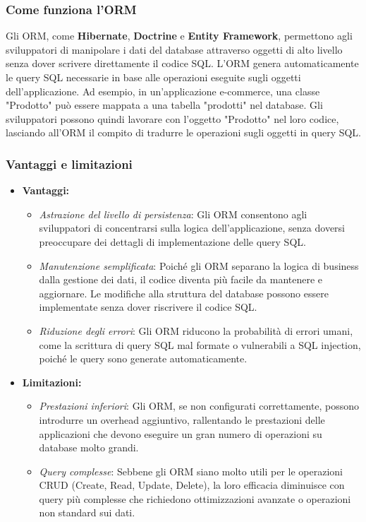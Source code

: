 \subsubsection{Come funziona l'ORM}
Gli ORM, come \textbf{Hibernate}, \textbf{Doctrine} e \textbf{Entity Framework}, permettono agli sviluppatori di manipolare i dati del database attraverso oggetti di alto livello senza dover scrivere direttamente il codice SQL. L'ORM genera automaticamente le query SQL necessarie in base alle operazioni eseguite sugli oggetti dell'applicazione. Ad esempio, in un'applicazione e-commerce, una classe "Prodotto" può essere mappata a una tabella "prodotti" nel database. Gli sviluppatori possono quindi lavorare con l'oggetto "Prodotto" nel loro codice, lasciando all'ORM il compito di tradurre le operazioni sugli oggetti in query SQL.

\subsubsection{Vantaggi e limitazioni}
\begin{itemize}
    \item \textbf{Vantaggi:}
    \begin{itemize}
        \item \textit{Astrazione del livello di persistenza}: Gli ORM consentono agli sviluppatori di concentrarsi sulla logica dell'applicazione, senza doversi preoccupare dei dettagli di implementazione delle query SQL.
        \item \textit{Manutenzione semplificata}: Poiché gli ORM separano la logica di business dalla gestione dei dati, il codice diventa più facile da mantenere e aggiornare. Le modifiche alla struttura del database possono essere implementate senza dover riscrivere il codice SQL.
        \item \textit{Riduzione degli errori}: Gli ORM riducono la probabilità di errori umani, come la scrittura di query SQL mal formate o vulnerabili a SQL injection, poiché le query sono generate automaticamente.
    \end{itemize}
    \item \textbf{Limitazioni:}
    \begin{itemize}
        \item \textit{Prestazioni inferiori}: Gli ORM, se non configurati correttamente, possono introdurre un overhead aggiuntivo, rallentando le prestazioni delle applicazioni che devono eseguire un gran numero di operazioni su database molto grandi.
        \item \textit{Query complesse}: Sebbene gli ORM siano molto utili per le operazioni CRUD (Create, Read, Update, Delete), la loro efficacia diminuisce con query più complesse che richiedono ottimizzazioni avanzate o operazioni non standard sui dati.
    \end{itemize}
\end{itemize}

